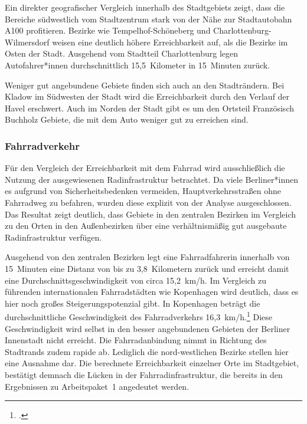 
Ein direkter geografischer Vergleich innerhalb des Stadtgebiets zeigt, dass die Bereiche südwestlich vom Stadtzentrum stark von der Nähe zur Stadtautobahn A100 profitieren. Bezirke wie Tempelhof-Schöneberg und Charlottenburg-Wilmersdorf weisen eine deutlich höhere Erreichbarkeit auf, als die Bezirke im Osten der Stadt. Ausgehend vom Stadtteil Charlottenburg legen Autofahrer*innen durchschnittlich 15,5~Kilometer in 15~Minuten zurück.

Weniger gut angebundene Gebiete finden sich auch an den Stadträndern. Bei Kladow im Südwesten der Stadt wird die Erreichbarkeit durch den Verlauf der Havel erschwert. Auch im Norden der Stadt gibt es um den Ortsteil Französisch Buchholz Gebiete, die mit dem Auto weniger gut zu erreichen sind.

\subsubsection{Fahrradverkehr}

Für den Vergleich der Erreichbarkeit mit dem Fahrrad wird ausschließlich die Nutzung der ausgewiesenen Radinfrastruktur betrachtet. Da viele Berliner*innen es aufgrund von Sicherheitsbedenken vermeiden, Hauptverkehrsstraßen ohne Fahrradweg zu befahren, wurden diese explizit von der Analyse ausgeschlossen. Das Resultat zeigt deutlich, dass Gebiete in den zentralen Bezirken im Vergleich zu den Orten in den Außenbezirken über eine verhältnismäßig gut ausgebaute Radinfrastruktur verfügen.


Ausgehend von den zentralen Bezirken legt eine Fahrradfahrerin innerhalb von 15~Minuten eine Distanz von bis zu 3,8~Kilometern zurück und erreicht damit eine Durchschnittsgeschwindigkeit von circa 15,2~km/h. Im Vergleich zu führenden internationalen Fahrradstädten wie Kopenhagen wird deutlich, dass es hier noch großes Steigerungspotenzial gibt. In Kopenhagen beträgt die durchschnittliche Geschwindigkeit des Fahrradverkehrs 16,3~km/h.\footcite{kopenhagen}
Diese Geschwindigkeit wird selbst in den besser angebundenen Gebieten der Berliner Innenstadt nicht erreicht. Die Fahrradanbindung nimmt in Richtung des Stadtrands zudem rapide ab. Lediglich die nord-westlichen Bezirke stellen hier eine Ausnahme dar. Die berechnete Erreichbarkeit einzelner Orte im Stadtgebiet, bestätigt demnach die Lücken in der Fahrradinfrastruktur, die bereits in den Ergebnissen zu Arbeitspaket~1 angedeutet werden.

